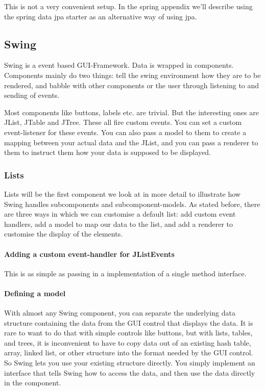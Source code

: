 This is not a very convenient setup. In the spring appendix we'll describe using the spring data jpa starter as an alternative way of using jpa.

\subsection{Swing}
 
 Swing is a event based GUI-Framework.
 Data is wrapped in components. Components mainly do two things: tell the swing environment how they are to be rendered, and babble with other components or the user through listening to and sending of events. 
 
 
 Most components like buttons, labels etc. are trivial. But the interesting ones are JList, JTable and JTree. These all fire custom events. 
 You can set a custom event-listener for these events. You can also pass a model to them to create a mapping between your actual data and the JList, and you can pass a renderer to them to instruct them how your data is supposed to be displayed. 
 
 
 \subsubsection{Lists}
 
 Lists will be the first component we look at in more detail to illustrate how Swing handles subcomponents and subcomponent-models. As stated before, there are three ways in which we can customise a default list: add custom event handlers, add a model to map our data to the list, and add a renderer to customise the display of the elements. 
 
 \paragraph{Adding a custom event-handler for JListEvents} This is as simple as passing in a implementation of a single method interface.
 
 \paragraph{Defining a model} With almost any Swing component, you can separate the underlying data structure containing the data from the GUI control that displays the data. It is rare to want to do that with simple controls like buttons, but with lists, tables, and trees, it is inconvenient to have to copy data out of an existing hash table, array, linked list, or other structure into the format needed by the GUI control. So Swing lets you use your existing structure directly. You simply implement an interface that tells Swing how to access the data, and then use the data directly in the component. 
 
